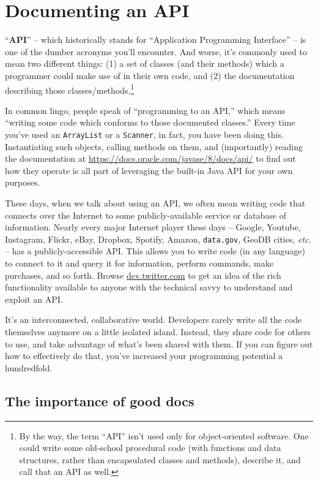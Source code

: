 
\chapter{Documenting an API}
\label{ch:api}

``\textbf{API}'' -- which historically stands for ``Application Programming
Interface'' -- is one of the dumber acronyms you'll encounter. And worse, it's
commonly used to mean two different things: (1) a set of classes (and their
methods) which a programmer could make use of in their own code, and (2) the
documentation describing those classes/methods.\footnote{By the way, the term
``API'' isn't used only for object-oriented software. One could write some
old-school procedural code (with functions and data structures, rather than
encapsulated classes and methods), describe it, and call that an API as well.}

In common lingo, people speak of ``programming to an API,'' which means
``writing some code which conforms to those documented classes.'' Every
time you've used an \texttt{ArrayList} or a \texttt{Scanner}, in fact, you
have been doing this. Instantiating such objects, calling methods on them, and
(importantly) reading the documentation at
\url{https://docs.oracle.com/javase/8/docs/api/} to find out how they
operate is all part of leveraging the built-in Java API for your own purposes.

These days, when we talk about using an API, we often mean writing code that
connects over the Internet to some publicly-available service or database of
information. Nearly every major Internet player these days -- Google, Youtube,
Instagram, Flickr, eBay, Dropbox, Spotify, Amazon, \texttt{data.gov}, GeoDB
cities, \textit{etc.} -- has a publicly-accessible API. This allows you to
write code (in any language) to connect to it and query it for information,
perform commands, make purchases, and so forth. Browse \url{dev.twitter.com} to
get an idea of the rich functionality available to anyone with the technical
savvy to understand and exploit an API.

It's an interconnected, collaborative world. Developers rarely write all the
code themselves anymore on a little isolated island. Instead, they share code
for others to use, and take advantage of what's been shared with them. If you
can figure out how to effectively do that, you've increased your programming
potential a hundredfold.

\section{The importance of good docs}

